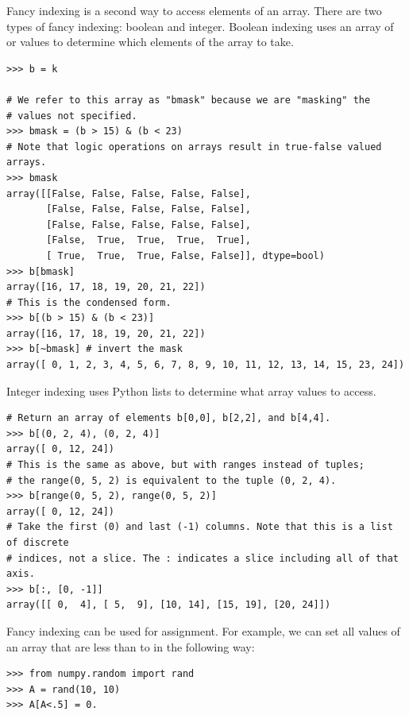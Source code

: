 Fancy indexing is a second way to access elements of an array. There are two types of fancy indexing: boolean and integer. 
Boolean indexing uses an array of  or  values to 
determine which elements of the array to take. 



\begin{lstlisting}
>>> b = k

# We refer to this array as "bmask" because we are "masking" the
# values not specified.
>>> bmask = (b > 15) & (b < 23) 
# Note that logic operations on arrays result in true-false valued arrays.
>>> bmask 
array([[False, False, False, False, False],
       [False, False, False, False, False],
       [False, False, False, False, False],
       [False,  True,  True,  True,  True],
       [ True,  True,  True, False, False]], dtype=bool)
>>> b[bmask]
array([16, 17, 18, 19, 20, 21, 22])
# This is the condensed form. 
>>> b[(b > 15) & (b < 23)] 
array([16, 17, 18, 19, 20, 21, 22])
>>> b[~bmask] # invert the mask
array([ 0, 1, 2, 3, 4, 5, 6, 7, 8, 9, 10, 11, 12, 13, 14, 15, 23, 24])
\end{lstlisting}

Integer indexing uses Python lists to determine what array values to access.
\begin{lstlisting}
# Return an array of elements b[0,0], b[2,2], and b[4,4].
>>> b[(0, 2, 4), (0, 2, 4)] 
array([ 0, 12, 24])
# This is the same as above, but with ranges instead of tuples; 
# the range(0, 5, 2) is equivalent to the tuple (0, 2, 4).
>>> b[range(0, 5, 2), range(0, 5, 2)] 
array([ 0, 12, 24])
# Take the first (0) and last (-1) columns. Note that this is a list of discrete
# indices, not a slice. The : indicates a slice including all of that axis.
>>> b[:, [0, -1]]  
array([[ 0,  4], [ 5,  9], [10, 14], [15, 19], [20, 24]])
\end{lstlisting}

Fancy indexing can
be used for assignment. For example, we can set all values of an array
that are less than  to  in the following way: 
\begin{lstlisting}
>>> from numpy.random import rand 
>>> A = rand(10, 10) 
>>> A[A<.5] = 0.
\end{lstlisting}



% 


